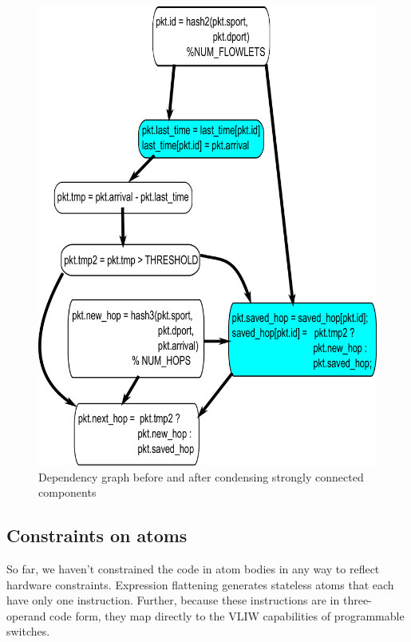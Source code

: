 \begin{figure}[!t]
\begin{minipage}{0.5\textwidth}
\includegraphics[width=\columnwidth]{scc.pdf}
\end{minipage}
\caption{Dependency graph before and after condensing strongly connected components}
\label{fig:partitioning}
\end{figure}

\subsection{Constraints on atoms}
\label{ss:complexity}
So far, we haven't constrained the code in atom bodies in any way to reflect
hardware constraints. Expression flattening generates stateless atoms that each
have only one instruction. Further, because these instructions are in
three-operand code form, they map directly to the VLIW capabilities of
programmable switches.

